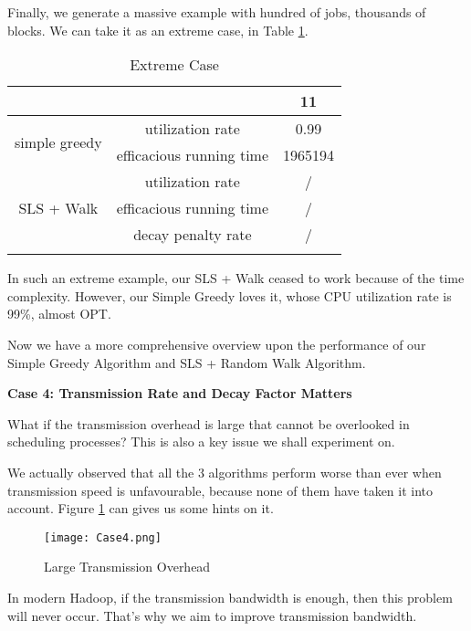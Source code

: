 \documentclass{article}
\begin{document}
    Finally, we generate a massive example with hundred of jobs, thousands of blocks. We can take it as an extreme case, in Table \ref{ExtremeCase}.
    
    \begin{table}[H]
    \centering
\begin{tabular}{ccc}

\hline
                       &                 & 11      \\ \hline
\multirow{2}{*}{simple   greedy} & utilization rate         & 0.99    \\
                                 & efficacious running time & 1965194 \\ \hline
\multirow{3}{*}{SLS   + Walk}    & utilization rate         & /       \\
                                 & efficacious running time & /       \\
                                 & decay penalty rate       & /       \\ \hline
                \label{ExtremeCase}
\end{tabular}
\caption{Extreme Case} 
\end{table}
    
    In such an extreme example, our SLS + Walk ceased to work because of the time complexity. However, our Simple Greedy loves it, whose CPU utilization rate is 99\%, almost OPT.
    
    Now we have a more comprehensive overview upon the performance of our Simple Greedy Algorithm and SLS + Random Walk Algorithm.
    
    \textbf{Case 4: Transmission Rate and Decay Factor Matters}
    
    What if the transmission overhead is large that cannot be overlooked in scheduling processes? This is also a key issue we shall experiment on.
    
    We actually observed that all the 3 algorithms perform worse than ever when transmission speed is unfavourable, because none of them have taken it into account. Figure \ref{Case4} can gives us some hints on it.
    
    \begin{figure}[H]
        \centering
        \texttt{[image: Case4.png]}
        \caption{Large Transmission Overhead}
        \label{Case4}
    \end{figure}
        
    In modern Hadoop, if the transmission bandwidth is enough, then this problem will never occur. That's why we aim to improve transmission bandwidth.
    
\end{document}
